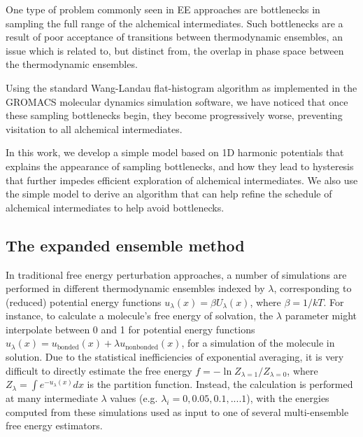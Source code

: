 \documentclass[%
 aip,
rsi,%
 amsmath,amssymb,
 reprint,%
]{revtex4-1}
\begin{document}
One type of problem commonly seen in EE approaches are bottlenecks in sampling the full range of the alchemical intermediates.  Such bottlenecks are a result of poor acceptance of transitions between thermodynamic ensembles, an issue which is related to, but distinct from, the overlap in phase space between the thermodynamic ensembles. 

Using the standard Wang-Landau flat-histogram algorithm as implemented in the GROMACS molecular dynamics simulation software, we have noticed that once these sampling bottlenecks begin, they become progressively worse, preventing visitation to all alchemical intermediates.

In this work, we develop a simple model based on 1D harmonic potentials that explains the appearance of sampling bottlenecks, and how they lead to hysteresis that further impedes efficient exploration of alchemical intermediates.  We also use the simple model to derive an algorithm that can help refine the schedule of alchemical intermediates to help avoid bottlenecks. 


\subsection*{The expanded ensemble method}

In traditional free energy perturbation approaches, a number of simulations are performed in different thermodynamic ensembles indexed by $\lambda$, corresponding to (reduced) potential energy functions $u_{\lambda}(x) = \beta U_{\lambda}(x)$, where $\beta = 1/kT$.  For instance, to calculate a molecule's free energy of solvation, the $\lambda$ parameter might interpolate between 0 and 1 for potential energy functions $u_{\lambda}(x) = u_{\text{bonded}}(x) + \lambda u_{\text{nonbonded}}(x)$, for a simulation of the molecule in solution.  Due to the statistical inefficiencies of exponential averaging, it is very difficult to directly estimate the free energy $f = -\ln Z_{\lambda=1}/Z_{\lambda=0}$, where $Z_{\lambda} = \int e^{-u_{\lambda}(x)} dx$ is the partition function.  Instead,  the calculation is performed at many intermediate $\lambda$ values (e.g. $\lambda_i = 0, 0.05, 0.1, .... 1$), with the energies computed from these simulations used as input to one of several multi-ensemble free energy estimators.\cite{shirts2008statistically, TI} 
\end{document}
